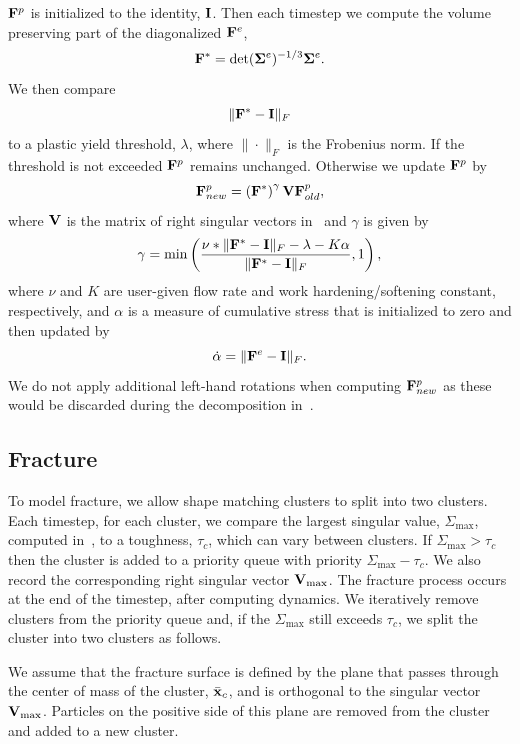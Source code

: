\documentclass[conference]{acmsiggraph}
\begin{document}
$\mathit{\mathbf{F}}^p$ is initialized to the identity, $\mathit{\mathbf{I}}$.  Then each timestep we compute the volume preserving part 
of the diagonalized $\mathit{\mathbf{F}}^e$,
\begin{equation}
\mathit{\mathbf{F}}^* = \det(\mathit{\mathbf{\Sigma}}^e)^{-1/3}\mathit{\mathbf{\Sigma}}^e.
\end{equation}
We then compare
\begin{equation}
\|\mathit{\mathbf{F}}^* - \mathit{\mathbf{I}}\|_F
\end{equation}
to a plastic yield threshold, $\lambda$, where $\|\cdot\|_F$ is the Frobenius norm.  If the threshold
is not exceeded $\mathit{\mathbf{F}}^p$ remains unchanged.  Otherwise we update $\mathit{\mathbf{F}}^p$ by
\begin{equation}
\mathit{\mathbf{F}}^p_{new} = \left(\mathit{\mathbf{F}}^*\right)^\gamma\mathit{\mathbf{V}}\mathit{\mathbf{F}}^p_{old},
\end{equation}
where $\mathit{\mathbf{V}}$ is the matrix of right singular vectors in~ and $\gamma$ is given by
\begin{equation}
\gamma = \min\left(\frac{\nu * \|\mathit{\mathbf{F}}^* - \mathit{\mathbf{I}}\|_F - \lambda - K\alpha}{\|\mathit{\mathbf{F}}^* - \mathit{\mathbf{I}}\|_F},1\right),
\end{equation}
where $\nu$ and $K$ are user-given flow rate and work hardening/softening constant, respectively, 
and $\alpha$ is a measure of cumulative stress that is initialized to zero and then updated by
\begin{equation}
\dot{\alpha} = \|\mathit{\mathbf{F}}^e-\mathit{\mathbf{I}}\|_F.
\end{equation}
We do not apply additional left-hand rotations when computing $\mathit{\mathbf{F}}^p_{new}$ as these would be discarded during
the decomposition in~.


\subsection{Fracture}
\label{sec:Fracture}
To model fracture, we allow shape matching clusters to split into two clusters.  Each timestep, for each cluster,
we compare the largest singular value, $\Sigma_{\max}$, computed in~, to a toughness, $\tau_c$, which
can vary between clusters.  
If $\Sigma_{\max} > \tau_c$ then the cluster is added to a priority queue with priority $\Sigma_{\max} - \tau_c$.  We also
record the corresponding right singular vector $\mathit{\mathbf{V}}_{\max}$.  The fracture process occurs 
at the end of the timestep, after computing dynamics.  We iteratively remove
clusters from the priority queue and, if the $\Sigma_{\max}$ still exceeds $\tau_c$, we split the cluster into two clusters
as follows.

We assume that the fracture surface is defined by the plane that passes through the center of mass of the 
cluster, $\bar{\mathit{\mathbf{x}}}_{c}$, and is orthogonal to the singular vector $\mathit{\mathbf{V}}_{\max}$.  Particles on the positive 
 side of this plane are removed from the cluster and added to a new cluster.  
 
\end{document}
